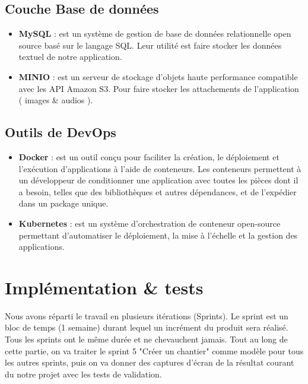 \subsection{Couche Base de donn\'ees}
\begin{itemize}
\item \textbf{MySQL} : est un syst\`eme de gestion de base de donn\'ees relationnelle open source bas\'e sur le langage \gls{SQL}. Leur utilit\'e est faire stocker les donn\'ees textuel de notre application.
\item \textbf{MINIO} : est un serveur de stockage d'objets haute performance compatible avec les API Amazon S3. Pour faire stocker les attachements de l'application ( images \& audios ).
\end{itemize}

\subsection{Outils de DevOps}

\begin{itemize}
\item \textbf{Docker} : est un outil con\c{c}u pour faciliter la cr\'eation, le d\'eploiement et l'ex\'ecution d'applications \`a l'aide de conteneurs. Les conteneurs permettent \`a un d\'eveloppeur de conditionner une application avec toutes les pi\`eces dont il a besoin, telles que des biblioth\`eques et autres d\'ependances, et de l'exp\'edier dans un package unique.

\item \textbf{Kubernetes} : est un syst\`eme d'orchestration de conteneur open-source permettant d'automatiser le d\'eploiement, la mise \`a l'\'echelle et la gestion des applications.

\end{itemize}

\section{Impl\'ementation \& tests}

Nous avons r\'eparti le travail en plusieurs it\'erations (Sprints). Le sprint est un bloc de temps (1 semaine) durant lequel un incr\'ement du produit sera r\'ealis\'e. Tous les sprints ont le m\^eme dur\'ee et ne chevauchent jamais. Tout au long de cette partie, on va traiter le sprint 5 "Cr\'eer un chantier" comme mod\`ele pour tous les autres sprints, puis on va donner des captures d'\'ecran de la r\'esultat courant du notre projet avec les tests de validation.

